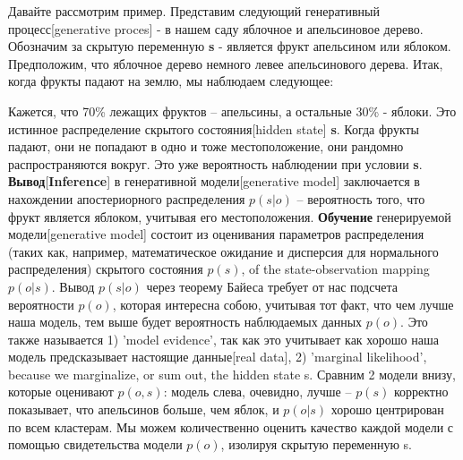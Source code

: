 \documentclass[twoside,leqno, 11pt]{article}
\begin{document}
	Давайте рассмотрим пример. Представим следующий генеративный процесс[generative proces] - в нашем саду яблочное и апельсиновое дерево. Обозначим за скрытую переменную \textbf{s} - является фрукт апельсином или яблоком. Предположим, что яблочное дерево немного левее апельсинового дерева. Итак, когда фрукты падают на землю, мы наблюдаем следующее:

	\begin{figure}[h]
		\label{ris:image}
	\end{figure}
	
	Кажется, что 70\% лежащих фруктов -- апельсины, а остальные 30\% - яблоки. Это истинное распределение скрытого состояния[hidden state] \textbf{s}. Когда фрукты падают, они не попадают в одно и тоже местоположение, они рандомно распространяются вокруг. Это уже вероятность наблюдении при условии \textbf{s}. \textbf{Вывод}[\textbf{Inference}] в генеративной модели[generative model] заключается в нахождении апостериорного распределения $p(s|o)$ -- вероятность того, что фрукт является яблоком, учитывая его местоположения. \textbf{Обучение} генерируемой модели[generative model] состоит из оценивания параметров распределения (таких как, например, математическое ожидание и дисперсия для нормального распределения) скрытого состояния $p(s)$, of the state-observation mapping $p(o|s)$. Вывод $p(s|o)$ через теорему Байеса требует от нас подсчета вероятности $p(o)$, которая интересна собою, учитывая тот факт, что чем лучше наша модель, тем выше будет вероятность наблюдаемых данных $p(o)$. Это также называется 1) 'model evidence', так как это учитывает как хорошо наша модель предсказывает настоящие данные[real data], 2) 'marginal likelihood',  because we marginalize, or sum out, the hidden state s.
	Сравним 2 модели внизу, которые оценивают $p(o,s)$: модель слева, очевидно, лучше -- $p(s)$ корректно показывает, что апельсинов больше, чем яблок, и $p(o|s)$ хорошо центрирован по всем кластерам. Мы можем количественно оценить качество каждой модели с помощью свидетельства модели $p(o)$, изолируя скрытую переменную s.
	
\end{document}
